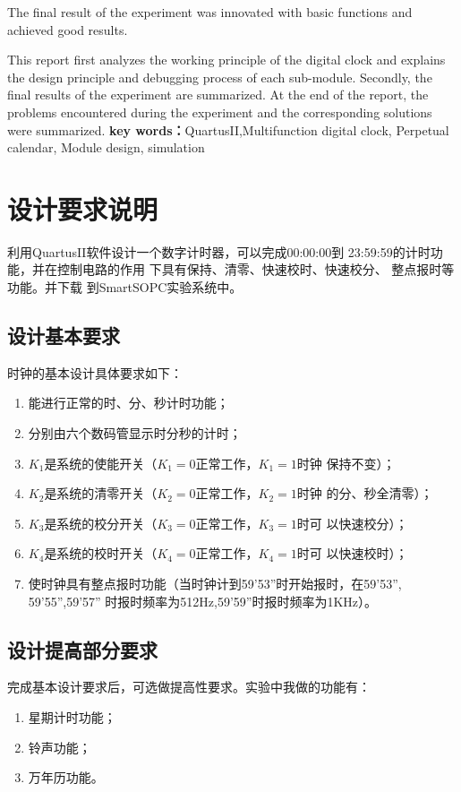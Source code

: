 \documentclass[12pt]{article}
\begin{document}
The final result of the experiment was innovated with basic functions and achieved good results.

This report first analyzes the working principle of the digital clock and explains the design principle and debugging process of each sub-module. Secondly, the final results of the experiment are summarized. At the end of the report, the problems encountered during the experiment and the corresponding solutions were summarized.\newline\newline
\textbf{key words：}QuartusII,Multifunction digital clock,
Perpetual calendar,
Module design,
simulation
\newpage

\tableofcontents
\thispagestyle{empty}
\newpage
\thispagestyle{empty}
\setcounter{page}{1}
\section{设计要求说明}
利用QuartusII软件设计一个数字计时器，可以完成00:00:00到
23:59:59的计时功能，并在控制电路的作用
下具有保持、清零、快速校时、快速校分、
整点报时等功能。并下载
到SmartSOPC实验系统中。
\subsection{设计基本要求}
时钟的基本设计具体要求如下：
\begin{enumerate}[1、]
\item 能进行正常的时、分、秒计时功能；
\item 分别由六个数码管显示时分秒的计时；
\item $K_1$是系统的使能开关（$K_1=0$正常工作，$K_1=1$时钟
保持不变）；
\item $K_2$是系统的清零开关（$K_2=0$正常工作，$K_2=1$时钟
的分、秒全清零）；
\item $K_3$是系统的校分开关（$K_3=0$正常工作，$K_3=1$时可
以快速校分）；
\item $K_4$是系统的校时开关（$K_4=0$正常工作，$K_4=1$时可
以快速校时）；
\item 使时钟具有整点报时功能（当时钟计到59’53”时开始报时，在59’53”, 59’55”,59’57” 时报时频率为512Hz,59’59”时报时频率为1KHz）。
\end{enumerate}
\subsection{设计提高部分要求}
完成基本设计要求后，可选做提高性要求。实验中我做的功能有：
\begin{enumerate}[1、]
\item 星期计时功能；
\item 铃声功能；
\item 万年历功能。
\end{enumerate}
\end{document}
